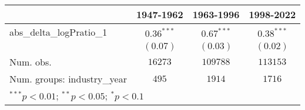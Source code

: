 
\begin{tabular}{l c c c}
\hline
 & 1947-1962 & 1963-1996 & 1998-2022 \\
\hline
abs\_delta\_logPratio\_1    & $0.36^{***}$ & $0.67^{***}$ & $0.38^{***}$ \\
                            & $(0.07)$     & $(0.03)$     & $(0.02)$     \\
\hline
Num. obs.                   & $16273$      & $109788$     & $113153$     \\
Num. groups: industry\_year & $495$        & $1914$       & $1716$       \\
\hline
\multicolumn{4}{l}{\scriptsize{$^{***}p<0.01$; $^{**}p<0.05$; $^{*}p<0.1$}}
\end{tabular}
